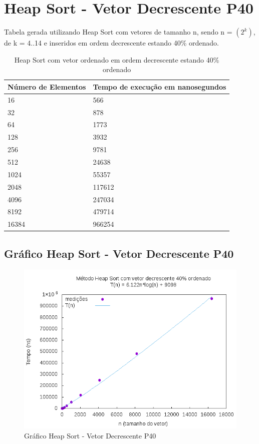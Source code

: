 \documentclass[12pt,a4paper,twoside]{report}
\begin{document}
\section{Heap Sort - Vetor Decrescente P40}
Tabela gerada utilizando Heap Sort com vetores de tamanho n, sendo n = $(2^k)$, de k = 4..14 e inseridos em ordem decrescente estando 40\% ordenado.
\begin{table}[H]
\centering
\caption{Heap Sort com vetor ordenado em ordem decrescente estando 40\% ordenado}
\label{my-label}
\begin{tabular}{|l|l|}
\hline
\multicolumn{1}{|c|}{\textbf{Número de Elementos}} & \multicolumn{1}{c|}{\textbf{Tempo de execução em nanosegundos}} \\ \hline
16 & 566 \\ \hline
32 & 878 \\ \hline
64 & 1773 \\ \hline
128 & 3932 \\ \hline
256 & 9781 \\ \hline
512 & 24638 \\ \hline
1024 & 55357 \\ \hline
2048 & 117612 \\ \hline
4096 & 247034 \\ \hline
8192 & 479714 \\ \hline
16384 & 966254 \\ \hline
\end{tabular}
\end{table}

\subsection{Gráfico Heap Sort - Vetor Decrescente P40}
\begin{figure}[H]
    \centering
    \includegraphics[width=0.7\linewidth]{graficos/HeapSort/vIntDecrescenteP40/vIntDecrescenteP40.png}
  \caption{Gráfico Heap Sort - Vetor Decrescente P40}
\end{figure}
\end{document}
